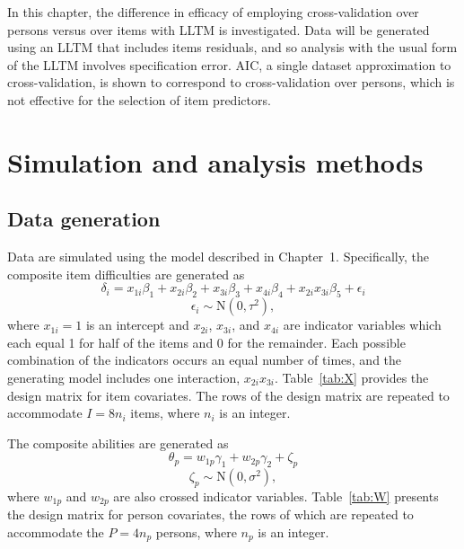\documentclass[12pt, letterpaper]{article}
\begin{document}
In this chapter, the difference in efficacy of employing cross-validation over persons versus over items with LLTM is investigated. Data will be generated using an LLTM that includes items residuals, and so analysis with the usual form of the LLTM involves specification error. AIC, a single dataset approximation to cross-validation, is shown to correspond to cross-validation over persons, which is not effective for the selection of item predictors.


\section{Simulation and analysis methods}

\subsection{Data generation}

Data are simulated using the model described in Chapter~1. 
Specifically, the composite item difficulties are generated as
\begin{equation}
	\delta_i = x_{1i}\beta_1 + x_{2i}\beta_2 + x_{3i}\beta_3 + x_{4i}\beta_4 + x_{2i}x_{3i}\beta_5 + \epsilon_i
\end{equation}
\begin{equation}
	\epsilon_i \sim \mathrm{N}(0, \tau^2)
,\end{equation}
where $x_{1i} = 1$ is an intercept and $x_{2i}$, $x_{3i}$, and $x_{4i}$ are indicator variables which each equal 1 for half of the items and 0 for the remainder. Each possible combination of the indicators occurs an equal number of times, and the generating model includes one interaction, $x_{2i}x_{3i}$. Table~\ref{tab:X} provides the design matrix for item covariates. The rows of the design matrix are repeated to accommodate $I = 8n_i$ items, where $n_i$ is an integer.



The composite abilities are generated as
\begin{equation} \label{eq:theta}
	\theta_p = w_{1p}\gamma_1 + w_{2p}\gamma_2  + \zeta_p
\end{equation}
\begin{equation} \label{eq:zeta}
	\zeta_p \sim \mathrm{N}(0, \sigma^2)
,\end{equation}
where $w_{1p}$ and $w_{2p}$ are also crossed indicator variables. Table~\ref{tab:W} presents the design matrix for person covariates, the rows of which are repeated to accommodate the $P = 4n_p$ persons, where $n_p$ is an integer.
\end{document}
